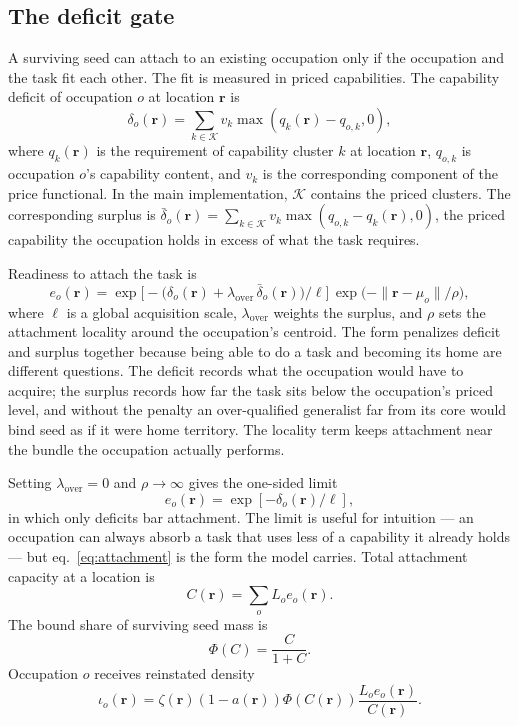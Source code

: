 \documentclass[12pt, a4paper]{article}
\begin{document}
\subsection{The deficit gate}
\label{sec:deficit-gate}

A surviving seed can attach to an existing occupation only if the
occupation and the task fit each other. The fit is measured in priced
capabilities. The capability deficit of occupation $o$ at location
$\mathbf{r}$ is
\begin{equation}
  \delta_o(\mathbf{r})
  =
  \sum_{k\in\mathcal K}
  v_k
  \max(q_k(\mathbf{r})-q_{o,k},0),
  \label{eq:deficit}
\end{equation}
where $q_k(\mathbf{r})$ is the requirement of capability cluster $k$ at
location $\mathbf{r}$, $q_{o,k}$ is occupation $o$'s capability content,
and $v_k$ is the corresponding component of the price functional. In
the main implementation, $\mathcal K$ contains the priced clusters. The
corresponding surplus is
$\bar\delta_o(\mathbf{r})=\sum_{k\in\mathcal K}
v_k\max(q_{o,k}-q_k(\mathbf{r}),0)$, the priced capability the
occupation holds in excess of what the task requires.

Readiness to attach the task is
\begin{equation}
  e_o(\mathbf{r})
  =
  \exp\!\bigl[
    -\bigl(\delta_o(\mathbf{r})
    +\lambda_{\mathrm{over}}\,\bar\delta_o(\mathbf{r})\bigr)/\ell
  \bigr]
  \,
  \exp\bigl(-\|\mathbf{r}-\mu_o\|/\rho\bigr),
  \label{eq:attachment}
\end{equation}
where $\ell$ is a global acquisition scale,
$\lambda_{\mathrm{over}}$ weights the surplus, and $\rho$ sets the
attachment locality around the occupation's centroid. The form
penalizes deficit and surplus together because being able to do a task
and becoming its home are different questions. The deficit records
what the occupation would have to acquire; the surplus records how far
the task sits below the occupation's priced level, and without the
penalty an over-qualified generalist far from its core would bind seed
as if it were home territory. The locality term keeps attachment near
the bundle the occupation actually performs.

Setting $\lambda_{\mathrm{over}}=0$ and $\rho\to\infty$ gives the
one-sided limit
\begin{equation}
  e_o(\mathbf{r})
  =
  \exp[-\delta_o(\mathbf{r})/\ell],
  \label{eq:readiness}
\end{equation}
in which only deficits bar attachment. The limit is useful for
intuition --- an occupation can always absorb a task that uses less of
a capability it already holds --- but eq.~\eqref{eq:attachment} is the
form the model carries. Total attachment capacity at
a location is
\[
  C(\mathbf{r})
  =
  \sum_o L_o e_o(\mathbf{r}).
\]
The bound share of surviving seed mass is
\[
  \Phi(C) = \frac{C}{1+C}.
\]
Occupation $o$ receives reinstated density
\begin{equation}
  \iota_o(\mathbf{r})
  =
  \zeta(\mathbf{r})
  (1-a(\mathbf{r}))
  \Phi(C(\mathbf{r}))
  \frac{
    L_o e_o(\mathbf{r})
  }{
    C(\mathbf{r})
  }.
  \label{eq:reinstated}
\end{equation}
\end{document}
